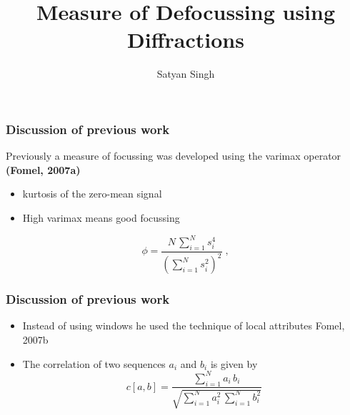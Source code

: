 

\title[]{Measure of Defocussing using Diffractions}
\subtitle{}
\author[]{Satyan Singh}
\date{}
\logo{}
\Large

\def\big#1{\begin{center} \LARGE \textbf{#1} \end{center}}
\def\cen#1{\begin{center}        \textbf{#1} \end{center}}

 { \cwpcover }

\begin{frame} \frametitle{Discussion of previous work}
Previously a measure of focussing was developed using the varimax operator \textbf{(Fomel, 2007a)}

\begin{itemize}
   \item kurtosis of the zero-mean signal
   \item High varimax means good focussing 
\end{itemize}
\begin{equation}
  \label{eq:focus} \phi = \frac{\displaystyle N\,\sum_{i=1}^N
  s_i^4}{\displaystyle \left(\sum_{i=1}^{N} s_i^2\right)^2}\;,
\end{equation}

\end{frame}
\cwpnote{}
\begin{frame} \frametitle{Discussion of previous work}
  \begin{itemize}
   \item Instead of using windows he used the technique of local attributes {Fomel, 2007b}
   \item The correlation of two sequences \textit{$a_i$} and \textit{$b_i$} is given by
	  \begin{equation}
  c[a,b] = {\frac{\displaystyle \sum_{i=1}^N a_i\,b_i}{\displaystyle \sqrt{\sum_{i=1}^N a_i^2\,\sum_{i=1}^N b_i^2}}}
  \label{eq:c}
	  \end{equation}
  \end{itemize}
 
\end{frame}

